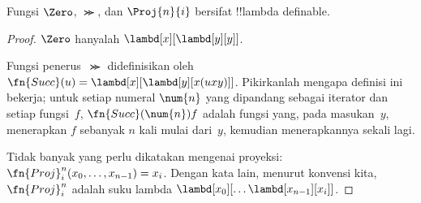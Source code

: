 \documentclass[../../../include/open-logic-section]{subfiles}
\begin{document}

\begin{lem}
Fungsi $\Zero$, $\Succ$, dan $\Proj{n}{i}$ bersifat !!{lambda definable}.
\end{lem}

\begin{proof}
$\Zero$ hanyalah
$\lambd[x][\lambd[y][y]]$.

Fungsi penerus~$\Succ$ didefinisikan oleh
$\fn{Succ}(u)=\lambd[x][\lambd[y][x(uxy)]]$. Pikirkanlah mengapa definisi ini
bekerja; untuk setiap numeral $\num{n}$ yang dipandang sebagai iterator dan
setiap fungsi~$f$, $\fn{Succ}(\num{n})f$ adalah fungsi yang, pada masukan~$y$,
menerapkan $f$ sebanyak $n$ kali mulai dari~$y$, kemudian menerapkannya sekali
lagi.

Tidak banyak yang perlu dikatakan mengenai proyeksi:
$\fn{Proj}^n_i(x_0, \dots, x_{n-1})=x_i$. Dengan kata lain, menurut konvensi
kita, $\fn{Proj}^n_i$ adalah suku lambda
$\lambd[x_0][\dots \lambd[x_{n-1}][x_i]]$.
\end{proof}
\end{document}
